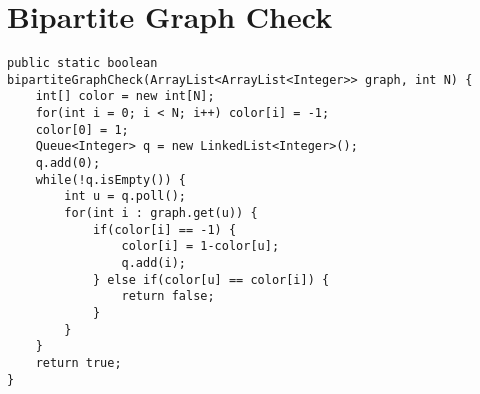 \documentclass[10pt,a4paper]{article}
\begin{document}
\section{Bipartite Graph Check}
\begin{lstlisting}
public static boolean bipartiteGraphCheck(ArrayList<ArrayList<Integer>> graph, int N) {
    int[] color = new int[N];
    for(int i = 0; i < N; i++) color[i] = -1;
    color[0] = 1;
    Queue<Integer> q = new LinkedList<Integer>();
    q.add(0);
    while(!q.isEmpty()) {
        int u = q.poll();
        for(int i : graph.get(u)) {
            if(color[i] == -1) {
                color[i] = 1-color[u];
                q.add(i);
            } else if(color[u] == color[i]) {
                return false;
            }
        }
    }
    return true;
}
\end{lstlisting}
\end{document}
